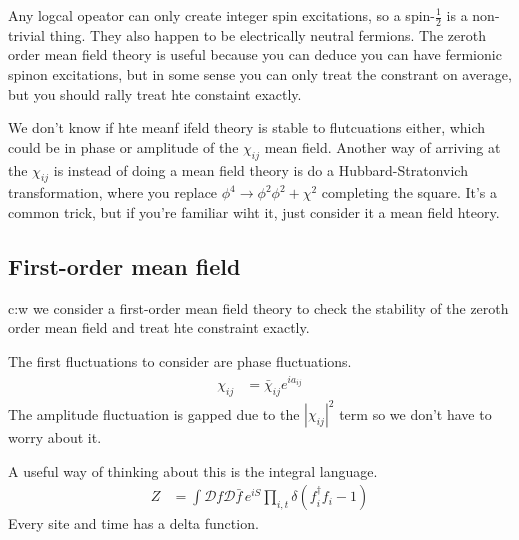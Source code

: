 Any logcal opeator can only create integer spin excitations,
so a spin-$\frac{1}{2}$ is a non-trivial thing.
They also happen to be electrically neutral fermions.
The zeroth order mean field theory is useful because you can deduce you can have
fermionic spinon excitations,
but in some sense you can only treat the constrant on average,
but you should rally treat hte constaint exactly.

We don't know if hte meanf ifeld theory is stable to flutcuations either,
which could be in phase or amplitude of the $\chi_{ij}$ mean field.
Another way of arriving at the $\chi_{ij}$
is instead of doing a mean field theory is do a
Hubbard-Stratonvich transformation,
where you replace
$\phi^4 \to \phi^2 \phi^2 + \chi^2$
completing the square.
It's a common trick,
but if you're familiar wiht it,
just consider it a mean field hteory.

\subsection{First-order mean field}c:w
we consider a first-order mean field theory
to check the stability of the zeroth order mean field
and treat hte constraint exactly.

The first fluctuations to consider are phase fluctuations.
\begin{align}
    \chi_{ij} &=
    \bar{\chi}_{ij} e^{i a_{ij}}
\end{align}
The amplitude fluctuation is gapped due to the $|\chi_{ij}|^2$
term so we don't have to worry about it.

A useful way of thinking about this is the integral language.
\begin{align}
    Z &=
    \int \mathcal{D} f \mathcal{D} \bar{f}\,
    e^{iS}
    \prod_{i,t} \delta\left( f_i^\dagger f_i - 1 \right)
\end{align}
Every site and time has a delta function.


